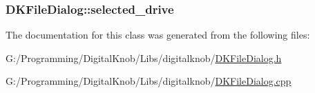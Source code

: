 \hypertarget{class_d_k_file_dialog_acc5d715fec68bffde3a6d884c0f9ebef}{
\subsubsection[{selected\-\_\-drive}]{ D\-K\-File\-Dialog\-::selected\-\_\-drive}}\label{class_d_k_file_dialog_acc5d715fec68bffde3a6d884c0f9ebef}


The documentation for this class was generated from the following files\-:\begin{DoxyCompactItemize}
\item 
G\-:/\-Programming/\-Digital\-Knob/\-Libs/digitalknob/\hyperlink{_d_k_file_dialog_8h}{D\-K\-File\-Dialog.\-h}\item 
G\-:/\-Programming/\-Digital\-Knob/\-Libs/digitalknob/\hyperlink{_d_k_file_dialog_8cpp}{D\-K\-File\-Dialog.\-cpp}\end{DoxyCompactItemize}
